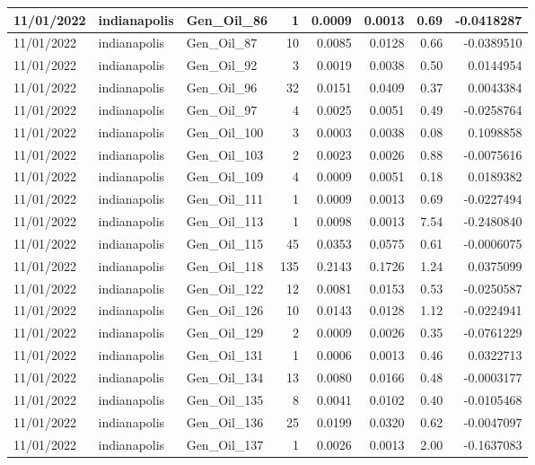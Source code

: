 \documentclass[
  letterpaper,
  DIV=11,
  numbers=noendperiod]{scrartcl}
\begin{document}
\begin{tabular}{l|l|l|r|r|r|r|r}
\hline
11/01/2022 & indianapolis & Gen\_Oil\_86 & 1 & 0.0009 & 0.0013 & 0.69 & -0.0418287\\
\hline
11/01/2022 & indianapolis & Gen\_Oil\_87 & 10 & 0.0085 & 0.0128 & 0.66 & -0.0389510\\
\hline
11/01/2022 & indianapolis & Gen\_Oil\_92 & 3 & 0.0019 & 0.0038 & 0.50 & 0.0144954\\
\hline
11/01/2022 & indianapolis & Gen\_Oil\_96 & 32 & 0.0151 & 0.0409 & 0.37 & 0.0043384\\
\hline
11/01/2022 & indianapolis & Gen\_Oil\_97 & 4 & 0.0025 & 0.0051 & 0.49 & -0.0258764\\
\hline
11/01/2022 & indianapolis & Gen\_Oil\_100 & 3 & 0.0003 & 0.0038 & 0.08 & 0.1098858\\
\hline
11/01/2022 & indianapolis & Gen\_Oil\_103 & 2 & 0.0023 & 0.0026 & 0.88 & -0.0075616\\
\hline
11/01/2022 & indianapolis & Gen\_Oil\_109 & 4 & 0.0009 & 0.0051 & 0.18 & 0.0189382\\
\hline
11/01/2022 & indianapolis & Gen\_Oil\_111 & 1 & 0.0009 & 0.0013 & 0.69 & -0.0227494\\
\hline
11/01/2022 & indianapolis & Gen\_Oil\_113 & 1 & 0.0098 & 0.0013 & 7.54 & -0.2480840\\
\hline
11/01/2022 & indianapolis & Gen\_Oil\_115 & 45 & 0.0353 & 0.0575 & 0.61 & -0.0006075\\
\hline
11/01/2022 & indianapolis & Gen\_Oil\_118 & 135 & 0.2143 & 0.1726 & 1.24 & 0.0375099\\
\hline
11/01/2022 & indianapolis & Gen\_Oil\_122 & 12 & 0.0081 & 0.0153 & 0.53 & -0.0250587\\
\hline
11/01/2022 & indianapolis & Gen\_Oil\_126 & 10 & 0.0143 & 0.0128 & 1.12 & -0.0224941\\
\hline
11/01/2022 & indianapolis & Gen\_Oil\_129 & 2 & 0.0009 & 0.0026 & 0.35 & -0.0761229\\
\hline
11/01/2022 & indianapolis & Gen\_Oil\_131 & 1 & 0.0006 & 0.0013 & 0.46 & 0.0322713\\
\hline
11/01/2022 & indianapolis & Gen\_Oil\_134 & 13 & 0.0080 & 0.0166 & 0.48 & -0.0003177\\
\hline
11/01/2022 & indianapolis & Gen\_Oil\_135 & 8 & 0.0041 & 0.0102 & 0.40 & -0.0105468\\
\hline
11/01/2022 & indianapolis & Gen\_Oil\_136 & 25 & 0.0199 & 0.0320 & 0.62 & -0.0047097\\
\hline
11/01/2022 & indianapolis & Gen\_Oil\_137 & 1 & 0.0026 & 0.0013 & 2.00 & -0.1637083\\

\end{tabular}
\end{document}
